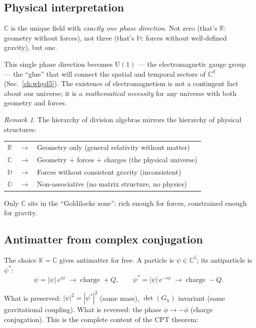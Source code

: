 \documentclass[12pt]{article}
\theoremstyle{remark}
\newtheorem{remark}[theorem]{Remark}
\theoremstyle{definition}
\begin{document}
\subsection{Physical interpretation}

$\mathbb{C}$ is the unique field with \emph{exactly one phase direction}. Not zero (that's $\mathbb{R}$: geometry without forces), not three (that's $\mathbb{H}$: forces without well-defined gravity), but one.

This single phase direction becomes $\text{U}(1)$ --- the electromagnetic gauge group --- the ``glue'' that will connect the spatial and temporal sectors of $\mathbb{C}^d$ (Sec.~\ref{ch:whyd5}). The existence of electromagnetism is not a contingent fact about our universe; it is a \emph{mathematical necessity} for any universe with both geometry and forces.

\begin{remark}
The hierarchy of division algebras mirrors the hierarchy of physical structures:
\begin{center}
\begin{tabular}{lcl}
$\mathbb{R}$ & $\to$ & Geometry only (general relativity without matter) \\
$\mathbb{C}$ & $\to$ & Geometry + forces + charges (the physical universe) \\
$\mathbb{H}$ & $\to$ & Forces without consistent gravity (inconsistent) \\
$\mathbb{O}$ & $\to$ & Non-associative (no matrix structure, no physics)
\end{tabular}
\end{center}
Only $\mathbb{C}$ sits in the ``Goldilocks zone'': rich enough for forces, constrained enough for gravity.
\end{remark}

\subsection{Antimatter from complex conjugation}

The choice $\mathbb{K} = \mathbb{C}$ gives antimatter for free. A particle is $\psi \in \mathbb{C}^5$; its antiparticle is $\psi^*$:
\begin{equation}
\psi = |\psi|\,e^{i\phi} \;\to\; \text{charge } +Q, \qquad \psi^* = |\psi|\,e^{-i\phi} \;\to\; \text{charge } -Q.
\end{equation}

What is preserved: $|\psi|^2 = |\psi^*|^2$ (same mass), $\det(G_h)$ invariant (same gravitational coupling). What is reversed: the phase $\phi \to -\phi$ (charge conjugation). This is the complete content of the CPT theorem:
\end{document}
